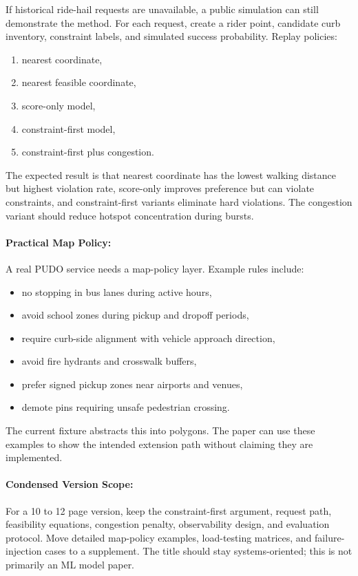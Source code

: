 \documentclass{article}
\begin{document}
If historical ride-hail requests are unavailable, a public simulation can still demonstrate the method. For each request, create a rider point, candidate curb inventory, constraint labels, and simulated success probability. Replay policies:
\begin{enumerate}
  \item nearest coordinate,
  \item nearest feasible coordinate,
  \item score-only model,
  \item constraint-first model,
  \item constraint-first plus congestion.
\end{enumerate}
The expected result is that nearest coordinate has the lowest walking distance but highest violation rate, score-only improves preference but can violate constraints, and constraint-first variants eliminate hard violations. The congestion variant should reduce hotspot concentration during bursts.

\paragraph{Practical Map Policy:}

A real PUDO service needs a map-policy layer. Example rules include:
\begin{itemize}
  \item no stopping in bus lanes during active hours,
  \item avoid school zones during pickup and dropoff periods,
  \item require curb-side alignment with vehicle approach direction,
  \item avoid fire hydrants and crosswalk buffers,
  \item prefer signed pickup zones near airports and venues,
  \item demote pins requiring unsafe pedestrian crossing.
\end{itemize}
The current fixture abstracts this into polygons. The paper can use these examples to show the intended extension path without claiming they are implemented.

\paragraph{Condensed Version Scope:}

For a 10 to 12 page version, keep the constraint-first argument, request path, feasibility equations, congestion penalty, observability design, and evaluation protocol. Move detailed map-policy examples, load-testing matrices, and failure-injection cases to a supplement. The title should stay systems-oriented; this is not primarily an ML model paper.
\end{document}
